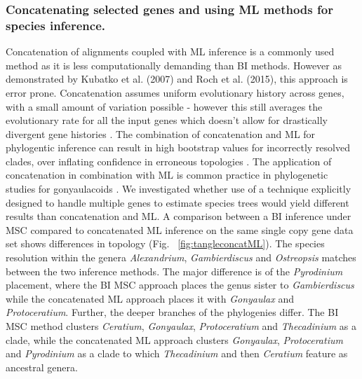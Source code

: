 \documentclass[12pt]{article}
\begin{document}
\subsubsection*{Concatenating selected genes and using ML methods for species inference.}
\FloatBarrier
Concatenation of alignments coupled with ML inference is a commonly used method as it is less computationally demanding than BI methods. 
However as demonstrated by Kubatko et al. (2007) and Roch et al. (2015), this approach is error prone. 
Concatenation assumes uniform evolutionary history across genes, with a small amount of variation possible - however this still averages the evolutionary rate for all the input genes which doesn't allow for drastically divergent gene histories \cite{roch2015likelihood}. 
The combination of concatenation and ML for phylogentic inference can result in high bootstrap values for incorrectly resolved clades, over inflating confidence in erroneous topologies \cite{degnan2009gene}. 
The application of concatenation in combination with ML is common practice in phylogenetic studies for gonyaulacoids  \cite{shalchian2006combined,zhang2007three,saldarriaga2004molecular,murray2005improving,hoppenrath2010dinoflagellate}.
We investigated whether use of a technique explicitly designed to handle multiple genes to estimate species trees would yield different results than concatenation and ML. 
A comparison between a BI inference under MSC compared to concatenated ML inference on the same single copy gene data set shows differences in topology (Fig. ~\ref{fig:tangleconcatML}). 
The species resolution within the genera \emph{Alexandrium}, \emph{Gambierdiscus} and \emph{Ostreopsis} matches between the two inference methods. 
The major difference is of the \emph{Pyrodinium} placement, where the BI MSC approach places the genus sister to \emph{Gambierdiscus} while the concatenated ML approach places it with \emph{Gonyaulax} and \emph{Protoceratium}. 
Further, the deeper branches of the phylogenies differ. 
The BI MSC method clusters \emph{Ceratium}, \emph{Gonyaulax}, \emph{Protoceratium} and \emph{Thecadinium} as a clade, while the concatenated ML approach clusters \emph{Gonyaulax}, \emph{Protoceratium} and \emph{Pyrodinium} as a clade to which \emph{Thecadinium} and then \emph{Ceratium} feature as ancestral genera. 
\end{document}
